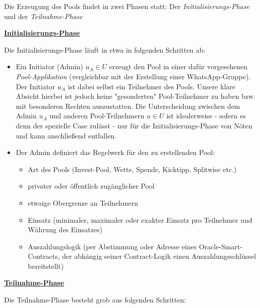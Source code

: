 
Die Erzeugung des Pools findet in zwei Phasen statt: Der \textit{Initialisierungs-Phase} und der \textit{Teilnahme-Phase}

\vspace{0.2cm}

\underline{\textbf{Initialisierungs-Phase}}

\vspace{0.2cm}

Die Initialisierungs-Phase läuft in etwa in folgenden Schritten ab:

\begin{itemize}
	\item Ein Initiator (Admin) $u_A \in U$ erzeugt den Pool in einer dafür vorgesehenen \textit{Pool-Applikation} (vergleichbar mit der Erstellung einer WhatsApp-Gruppe). Der Initiator $u_A$ ist dabei selbst ein Teilnehmer des Pools. Unsere klare Absicht hierbei ist jedoch keine "gesonderten" Pool-Teilnehmer zu haben bzw. mit besonderen Rechten auszustatten. Die Unterscheidung zwischen dem Admin $u_A$ und anderen Pool-Teilnehmern $u \in U$ ist idealerweise - sofern es denn der spezielle Case zulässt - nur für die Initialisierungs-Phase von Nöten und kann anschließend entfallen.
	\item Der Admin definiert das Regelwerk für den zu erstellenden Pool:
	\begin{itemize}
		\item Art des Pools (Invest-Pool, Wette, Spende, Kicktipp, Splitwise etc.)
		\item privater oder öffentlich zugänglicher Pool
		\item etwaige Obergrenze an Teilnehmern
		\item Einsatz (minimaler, maximaler oder exakter Einsatz pro Teilnehmer und Währung des Einsatzes)
		\item Auszahlungslogik (per Abstimmung oder Adresse eines Oracle-Smart-Contracts, der abhängig seiner Contract-Logik einen Auszahlungsschlüssel bereitstellt)
	\end{itemize}
\end{itemize}

\vspace{0.3cm}

\underline{\textbf{Teilnahme-Phase}}

\vspace{0.2cm}

Die Teilnahme-Phase besteht grob aus folgenden Schritten:

